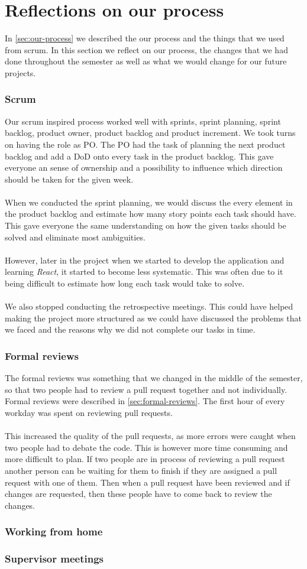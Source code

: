 \section{Reflections on our process}
In \autoref{sec:our-process} we described the our process and the things that we used from scrum.
In this section we reflect on our process, the changes that we had done throughout the semester as well as what we would change for our future projects.

\subsubsection{Scrum}
Our scrum inspired process worked well with sprints, sprint planning, sprint backlog, product owner, product backlog and product increment.
We took turns on having the role as PO.
The PO had the task of planning the next product backlog and add a DoD onto every task in the product backlog.
This gave everyone an sense of ownership and a possibility to influence which direction should be taken for the given week.
\\\\
When we conducted the sprint planning, we would discuss the every element in the product backlog and estimate how many story points each task should have.
This gave everyone the same understanding on how the given tasks should be solved and eliminate most ambiguities. 
\\\\
However, later in the project when we started to develop the application and learning \textit{React}, it started to become less systematic.
This was often due to it being difficult to estimate how long each task would take to solve.
\\\\
We also stopped conducting the retrospective meetings. 
This could have helped making the project more structured as we could have discussed the problems that we faced and the reasons why we did not complete our tasks in time.

\subsubsection{Formal reviews}
The formal reviews was something that we changed in the middle of the semester, so that two people had to review a pull request together and not individually.
Formal reviews were described in \autoref{sec:formal-reviews}.
The first hour of every workday was spent on reviewing pull requests.
\\\\
This increased the quality of the pull requests, as more errors were caught when two people had to debate the code.
This is however more time consuming and more difficult to plan.
If two people are in process of reviewing a pull request another person can be waiting for them to finish if they are assigned a pull request with one of them. 
Then when a pull request have been reviewed and if changes are requested, then these people have to come back to review the changes.

\subsubsection{Working from home}

\subsubsection{Supervisor meetings}


